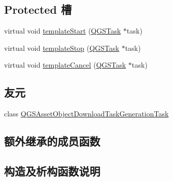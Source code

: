 \subsection*{Protected 槽}
\begin{DoxyCompactItemize}
\item 
virtual void \mbox{\hyperlink{class_q_g_s_asset_index_json_download_task_generation_task_a5bef3a606eedad05f66f6824f4ded1b8}{template\+Start}} (\mbox{\hyperlink{class_q_g_s_task}{Q\+G\+S\+Task}} $\ast$task)
\item 
virtual void \mbox{\hyperlink{class_q_g_s_asset_index_json_download_task_generation_task_a26cee6a91f6d81f749dfc900d7a2f73f}{template\+Stop}} (\mbox{\hyperlink{class_q_g_s_task}{Q\+G\+S\+Task}} $\ast$task)
\item 
virtual void \mbox{\hyperlink{class_q_g_s_asset_index_json_download_task_generation_task_a91908d4dffc78e00ee717739ec8246a5}{template\+Cancel}} (\mbox{\hyperlink{class_q_g_s_task}{Q\+G\+S\+Task}} $\ast$task)
\end{DoxyCompactItemize}
\subsection*{友元}
\begin{DoxyCompactItemize}
\item 
class \mbox{\hyperlink{class_q_g_s_asset_index_json_download_task_generation_task_aec6e1c8ab10577e704203a6195bad762}{Q\+G\+S\+Asset\+Object\+Download\+Task\+Generation\+Task}}
\end{DoxyCompactItemize}
\subsection*{额外继承的成员函数}


\subsection{构造及析构函数说明}
\mbox{\label{class_q_g_s_asset_index_json_download_task_generation_task_a7573e75179001680e095ac8db65e7675}} 
